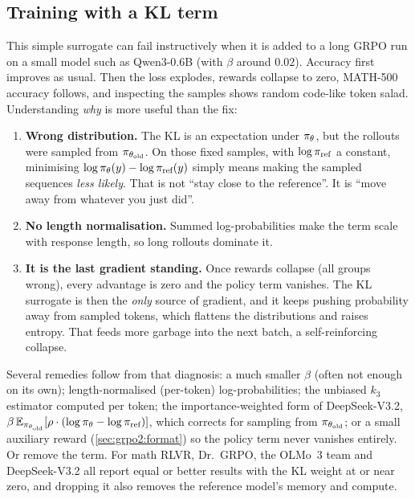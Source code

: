 \subsection{Training with a KL term}\label{sec:grpo2:kltrain}

This simple surrogate can fail instructively when it is added to a long GRPO run on a small
model such as Qwen3-0.6B (with $\beta$ around $0.02$). Accuracy first improves as usual. Then the loss explodes,
rewards collapse to zero, MATH-500 accuracy follows, and inspecting the samples shows random
code-like token salad. Understanding \emph{why} is more useful than the fix:
\begin{enumerate}
\item \textbf{Wrong distribution.} The KL is an expectation under $\pi_\theta$, but the rollouts
were sampled from $\pi_{\theta_{\text{old}}}$. On those fixed samples, with $\log\pi_{\text{ref}}$ a constant, minimising
$\log\pi_\theta(y)-\log\pi_{\text{ref}}(y)$ simply means making the sampled sequences \emph{less likely}.
That is not ``stay close to the reference''. It is ``move away from whatever you just did''.
\item \textbf{No length normalisation.} Summed log-probabilities make the term scale with
response length, so long rollouts dominate it.
\item \textbf{It is the last gradient standing.} Once rewards collapse (all groups wrong),
every advantage is zero and the policy term vanishes. The KL surrogate is then the
\emph{only} source of gradient, and it keeps pushing probability away from sampled tokens,
which flattens the distributions and raises entropy. That feeds more garbage into the next
batch, a self-reinforcing collapse.
\end{enumerate}

Several remedies follow from that diagnosis: a much smaller $\beta$ (often not enough on its own); length-normalised (per-token) log-probabilities; the
unbiased $k_3$ estimator computed per token; the importance-weighted form of DeepSeek-V3.2,
$\beta\,\mathbb{E}_{\pi_{\theta_{\text{old}}}}[\rho\cdot(\log\pi_\theta-\log\pi_{\text{ref}})]$, which corrects for sampling from
$\pi_{\theta_{\text{old}}}$; or a small auxiliary reward (\cref{sec:grpo2:format}) so the policy term never
vanishes entirely. Or remove the term. For math RLVR, Dr.~GRPO, the OLMo~3 team and
DeepSeek-V3.2 all report equal or better results with the KL weight at or near zero, and
dropping it also removes the reference model's memory and compute.

